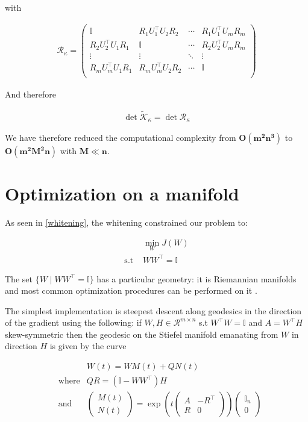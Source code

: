 \documentclass[a4paper,BCOR=5mm,oneside,openany]{scrreprt}
\begin{document}
with

\begin{align*}
	\mathcal{R}_\kappa =  \begin{pmatrix}
		\mathbb{I} & R_1 U_1^\intercal U_2 R_2  & \cdots &  R_1 U_1^\intercal U_m R_m \\
		R_2 U_2^\intercal U_1 R_1 & \mathbb{I} & \cdots & R_2 U_2^\intercal U_m R_m \\
		\vdots & \vdots & \ddots & \vdots \\
		R_m U_m^\intercal U_1 R_1 & R_m U_m^\intercal U_2 R_2 & \cdots & \mathbb{I} \\
	\end{pmatrix}
\end{align*}

And therefore

\begin{align*}
	\det \tilde{\mathcal{K}}_\kappa = \det \mathcal{R}_\kappa
\end{align*}

We have therefore reduced the computational complexity from $\mathbf{O(m^2 n^3)}$ to $\mathbf{O(m^2 M^2 n)}$ with $\mathbf{M \ll n}$.

\section{Optimization on a manifold}

As seen in \ref{whitening}, the whitening constrained our problem to:

\begin{align*}
	&\min_W J(W) \\
	\text{s.t } &W W^\intercal = \mathbb{I}
\end{align*}

The set $\{ W \mid W W^\intercal = \mathbb{I} \}$ has a particular geometry: it is Riemannian manifolds and most common optimization procedures can be performed on it \cite{Edelman1998}.

The simplest implementation is steepest descent along geodesics in the direction of the gradient using the following: if $W, H \in \mathcal{R}^{m \times n}$ s.t $W^\intercal W = \mathbb{I}$ and $A = W^\intercal H$ skew-symmetric then the geodesic on the Stiefel manifold emanating from $W$ in direction $H$ is given by the curve

\begin{align*}
	& &W (t) = W M (t) + Q N (t) \\
	&\text{where} & QR = (\mathbb{I} - W W^\intercal) H \\
	&\text{and} &\begin{pmatrix}
		M(t) \\ N(t)
	\end{pmatrix} = \exp \left( t \begin{pmatrix}
		A & - R^\intercal \\
		R & 0
	\end{pmatrix} \right) \begin{pmatrix}
		\mathbb{I}_n \\ 0
	\end{pmatrix}
\end{align*}
						
\end{document}
